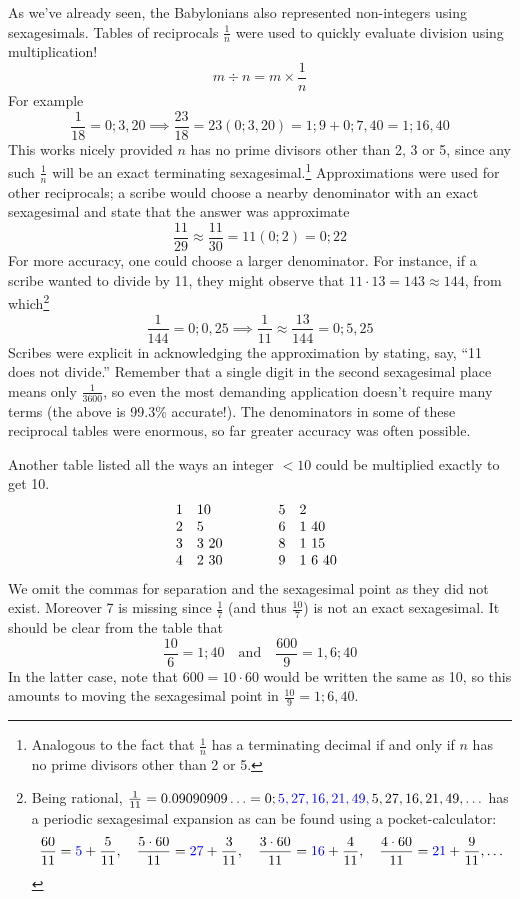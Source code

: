 \goodbreak


\label{babfraction}

As we've already seen, the Babylonians also represented non-integers using sexagesimals. Tables of reciprocals $\frac 1n$ were used to quickly evaluate division using multiplication!
\[
	m\div n=m\times \frac 1n
\]
For example
\[
	\frac 1{18}=0;3,20 \implies \frac{23}{18}=23(0;3,20) =1;9+0;7,40 =1;16,40
\]
This works nicely provided $n$ has no prime divisors other than 2, 3 or 5, since any such $\frac 1n$ will be an exact terminating sexagesimal.\footnote{%
	Analogous to the fact that $\frac 1n$ has a terminating decimal if and only if $n$ has no prime divisors other than 2 or 5.%
}
Approximations were used for other reciprocals; a scribe would choose a nearby denominator with an exact sexagesimal and state that the answer was approximate
\[
	\frac{11}{29}\approx\frac{11}{30}=11(0;2)=0;22
\]
For more accuracy, one could choose a larger denominator. For instance, if a scribe wanted to divide by 11, they might observe that $11\cdot 13=143\approx 144$, from which\footnote{%
	Being rational, $\frac 1{11}=0.09090909\ldots=0;\textcolor{blue}{5,27,16,21,49,\,}5,27,16,21,49,\ldots$ has a periodic sexagesimal expansion as can be found using a pocket-calculator:
	\[
		\frac{60}{11}=\textcolor{blue}{5}+\frac 5{11},\quad 
		\frac{5\cdot 60}{11}=\textcolor{blue}{27}+\frac 3{11},\quad 
		\frac{3\cdot 60}{11}=\textcolor{blue}{16}+\frac{4}{11},\quad 
		\frac{4\cdot 60}{11}=\textcolor{blue}{21}+\frac{9}{11},\ldots
	\]%
}
\[
	\frac 1{144}=0;0,25\implies \frac 1{11}\approx\frac{13}{144}=0;5,25
\]
Scribes were explicit in acknowledging the approximation by stating, say, ``11 does not divide.'' Remember that a single digit in the second sexagesimal place means only $\frac 1{3600}$, so even the most demanding application doesn't require many terms (the above is 99.3\%{} accurate!).  The denominators in some of these reciprocal tables were enormous, so far greater accuracy was often possible.
\medbreak


Another table listed all the ways an integer $<10$ could be multiplied exactly to get 10.
\[
	\begin{array}{@{}cl@{\qquad\qquad}cl}
		1&10&5&2\\
		2&5&6&1\ 40\\
		3&3\ 20&8&1\ 15\\
		4&2\ 30&9&1\ 6\ 40
\end{array}
\]
We omit the commas for separation and the sexagesimal point as they did not exist. Moreover 7 is missing since $\frac 17$ (and thus $\frac{10}7$) is not an exact sexagesimal. It should be clear from the table that
\[
	\frac{10}6=1;40\quad\text{and}\quad \frac{600}9=1,6;40
\]
In the latter case, note that $600=10\cdot 60$ would be written the same as 10, so this amounts to moving the sexagesimal point in $\frac{10}9=1;6,40$.


